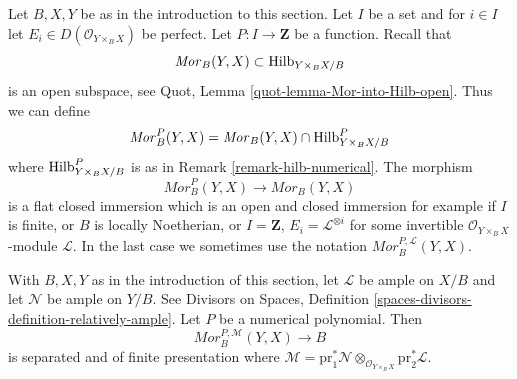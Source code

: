 \begin{remark}
\label{remark-Mor-numerical}
Let $B, X, Y$ be as in the introduction to this section.
Let $I$ be a set and for $i \in I$ let
$E_i \in D(\mathcal{O}_{Y \times_B X})$ be perfect.
Let $P : I \to \mathbf{Z}$ be a function. Recall that
$$
\mathit{Mor}_B(Y, X) \subset
\mathrm{Hilb}_{Y \times_B X/B}
$$
is an open subspace, see Quot, Lemma \ref{quot-lemma-Mor-into-Hilb-open}.
Thus we can define
$$
\mathit{Mor}^P_B(Y, X) =
\mathit{Mor}_B(Y, X) \cap \mathrm{Hilb}^P_{Y \times_B X/B}
$$
where $\mathrm{Hilb}^P_{Y \times_B X/B}$ is as in
Remark \ref{remark-hilb-numerical}. The morphism
$$
\mathit{Mor}^P_B(Y, X) \longrightarrow \mathit{Mor}_B(Y, X)
$$
is a flat closed immersion which is an open and closed immersion
for example if $I$ is finite, or $B$ is locally Noetherian, or
$I = \mathbf{Z}$, $E_i = \mathcal{L}^{\otimes i}$
for some invertible $\mathcal{O}_{Y \times_B X}$-module $\mathcal{L}$.
In the last case we sometimes use the notation
$\mathit{Mor}^{P, \mathcal{L}}_B(Y, X)$.
\end{remark}

\begin{lemma}
\label{lemma-Mor-qc-over-base}
With $B, X, Y$ as in the introduction of this section, let
$\mathcal{L}$ be ample on $X/B$ and let $\mathcal{N}$ be ample on $Y/B$.
See Divisors on Spaces, Definition
\ref{spaces-divisors-definition-relatively-ample}.
Let $P$ be a numerical polynomial. Then
$$
\mathit{Mor}^{P, \mathcal{M}}_B(Y, X) \longrightarrow B
$$
is separated and of finite presentation where
$\mathcal{M} = \text{pr}_1^*\mathcal{N}
\otimes_{\mathcal{O}_{Y \times_B X}} \text{pr}_2^*\mathcal{L}$.
\end{lemma}

